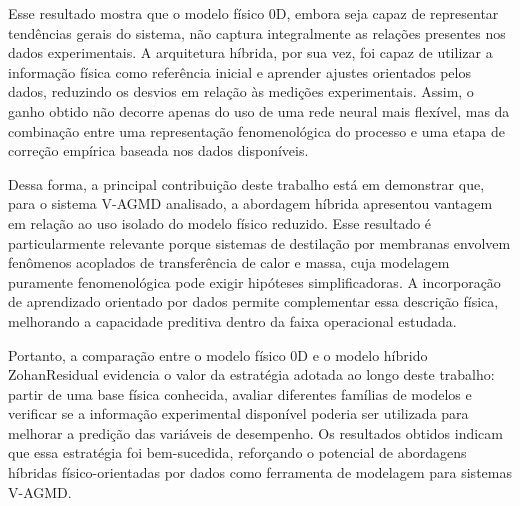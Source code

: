 Esse resultado mostra que o modelo físico 0D, embora seja capaz de representar tendências gerais do sistema, não captura integralmente as relações presentes nos dados experimentais. A arquitetura híbrida, por sua vez, foi capaz de utilizar a informação física como referência inicial e aprender ajustes orientados pelos dados, reduzindo os desvios em relação às medições experimentais. Assim, o ganho obtido não decorre apenas do uso de uma rede neural mais flexível, mas da combinação entre uma representação fenomenológica do processo e uma etapa de correção empírica baseada nos dados disponíveis.

Dessa forma, a principal contribuição deste trabalho está em demonstrar que, para o sistema V-AGMD analisado, a abordagem híbrida apresentou vantagem em relação ao uso isolado do modelo físico reduzido. Esse resultado é particularmente relevante porque sistemas de destilação por membranas envolvem fenômenos acoplados de transferência de calor e massa, cuja modelagem puramente fenomenológica pode exigir hipóteses simplificadoras. A incorporação de aprendizado orientado por dados permite complementar essa descrição física, melhorando a capacidade preditiva dentro da faixa operacional estudada.

Portanto, a comparação entre o modelo físico 0D e o modelo híbrido ZohanResidual evidencia o valor da estratégia adotada ao longo deste trabalho: partir de uma base física conhecida, avaliar diferentes famílias de modelos e verificar se a informação experimental disponível poderia ser utilizada para melhorar a predição das variáveis de desempenho. Os resultados obtidos indicam que essa estratégia foi bem-sucedida, reforçando o potencial de abordagens híbridas físico-orientadas por dados como ferramenta de modelagem para sistemas V-AGMD.